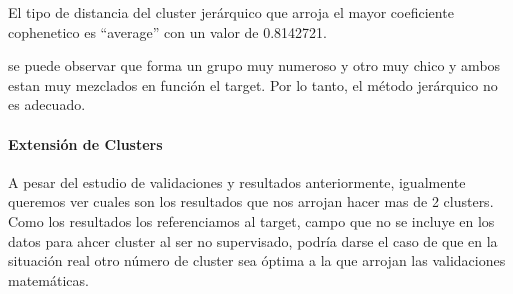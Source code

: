 \documentclass[]{article}
\let\oldparagraph\paragraph
\renewcommand{\paragraph}[1]{\oldparagraph{#1}\mbox{}}
\begin{document}
El tipo de distancia del cluster jerárquico que arroja el mayor
coeficiente cophenetico es ``average'' con un valor de 0.8142721.

\begin{table}[!h]

\caption{\label{tab:tabla_jerarquico_composicion}Composición de clusters según la clase deserto}
\centering
{}
\end{table}

se puede observar que forma un grupo muy numeroso y otro muy chico y
ambos estan muy mezclados en función el target. Por lo tanto, el método
jerárquico no es adecuado.

\hypertarget{extensiuxf3n-de-clusters}{%
\paragraph{Extensión de Clusters}\label{extensiuxf3n-de-clusters}}

A pesar del estudio de validaciones y resultados anteriormente,
igualmente queremos ver cuales son los resultados que nos arrojan hacer
mas de 2 clusters. Como los resultados los referenciamos al target,
campo que no se incluye en los datos para ahcer cluster al ser no
supervisado, podría darse el caso de que en la situación real otro
número de cluster sea óptima a la que arrojan las validaciones
matemáticas.
\end{document}
